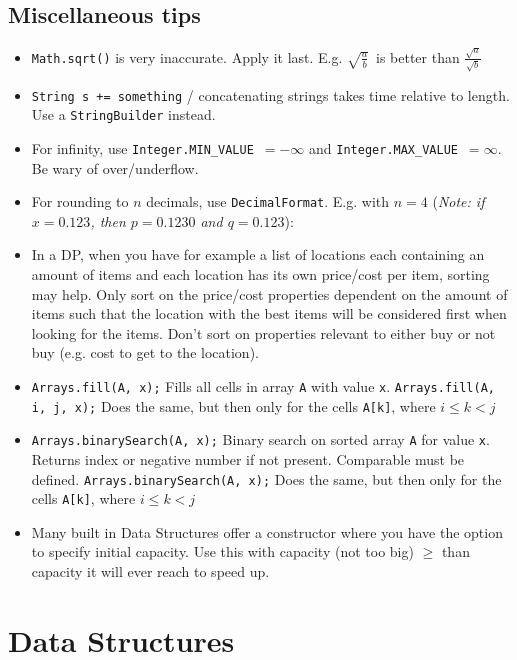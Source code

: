 \documentclass[a4paper,10pt]{article}
\begin{document}
\begin{multicols}{2}
\subsection{Miscellaneous tips}
\begin{itemize}[nolistsep,noitemsep]
\item \lstinline|Math.sqrt()| is very inaccurate. Apply it last. E.g. $\sqrt{\frac{a}{b}}$\ is better than $\frac{\sqrt{a}}{\sqrt{b}}$
\item \lstinline|String s += something| / concatenating strings takes time relative to length. Use a \lstinline|StringBuilder| instead.
\item For infinity, use \lstinline|Integer.MIN_VALUE|\ $=-\infty$ and \lstinline|Integer.MAX_VALUE|\ $=\infty$. Be wary of over/underflow.
\item For rounding to $n$ decimals, use \lstinline|DecimalFormat|. E.g. with $n=4$ (\textit{Note: if $x=0.123$, then $p=0.1230$ and $q=0.123$}):

\item In a DP, when you have for example a list of locations each containing an amount of items and each location has its own price/cost per item, sorting may help. Only sort on the price/cost properties dependent on the amount of items such that the location with the best items will be considered first when looking for the items. Don't sort on properties relevant to either buy or not buy (e.g. cost to get to the location).
\item \lstinline|Arrays.fill(A, x);| Fills all cells in array \lstinline|A| with value \lstinline|x|. \lstinline|Arrays.fill(A, i, j, x);| Does the same, but then only for the cells \lstinline|A[k]|, where $i\leq k<j$
\item \lstinline|Arrays.binarySearch(A, x);| Binary search on sorted array \lstinline|A| for value \lstinline|x|. Returns index or negative number if not present. Comparable must be defined. \lstinline|Arrays.binarySearch(A, x);| Does the same, but then only for the cells \lstinline|A[k]|, where $i\leq k<j$
\item Many built in Data Structures offer a constructor where you have the option to specify initial capacity. Use this with capacity (not too big) $\geq$ than capacity it will ever reach to speed up.
\end{itemize}





\section{Data Structures}

\end{multicols}
\end{document}

